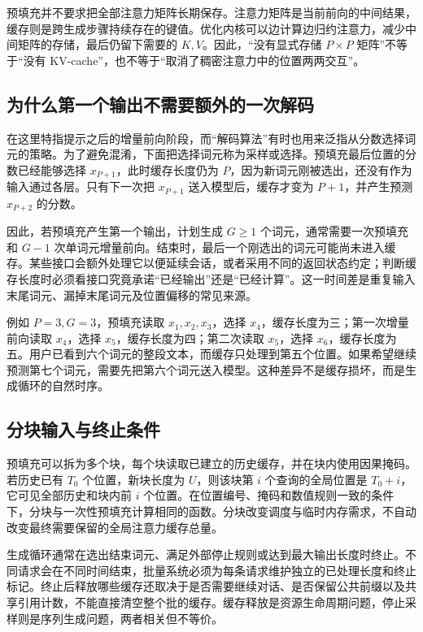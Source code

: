 \documentclass[UTF8,12pt,a4paper,fontset=fandol]{ctexart}
\begin{document}
预填充并不要求把全部注意力矩阵长期保存。注意力矩阵是当前前向的中间结果，缓存则是跨生成步骤持续存在的键值。优化内核可以边计算边归约注意力，减少中间矩阵的存储，最后仍留下需要的 $K,V$。因此，“没有显式存储 $P\times P$ 矩阵”不等于“没有 KV-cache”，也不等于“取消了稠密注意力中的位置两两交互”。

\subsection{为什么第一个输出不需要额外的一次解码}

在这里特指提示之后的增量前向阶段，而“解码算法”有时也用来泛指从分数选择词元的策略。为了避免混淆，下面把选择词元称为采样或选择。预填充最后位置的分数已经能够选择 $x_{P+1}$，此时缓存长度仍为 $P$，因为新词元刚被选出，还没有作为输入通过各层。只有下一次把 $x_{P+1}$ 送入模型后，缓存才变为 $P+1$，并产生预测 $x_{P+2}$ 的分数。

因此，若预填充产生第一个输出，计划生成 $G\geq1$ 个词元，通常需要一次预填充和 $G-1$ 次单词元增量前向。结束时，最后一个刚选出的词元可能尚未进入缓存。某些接口会额外处理它以便延续会话，或者采用不同的返回状态约定；判断缓存长度时必须看接口究竟承诺“已经输出”还是“已经计算”。这一时间差是重复输入末尾词元、漏掉末尾词元及位置偏移的常见来源。

例如 $P=3,G=3$，预填充读取 $x_1,x_2,x_3$，选择 $x_4$，缓存长度为三；第一次增量前向读取 $x_4$，选择 $x_5$，缓存长度为四；第二次读取 $x_5$，选择 $x_6$，缓存长度为五。用户已看到六个词元的整段文本，而缓存只处理到第五个位置。如果希望继续预测第七个词元，需要先把第六个词元送入模型。这种差异不是缓存损坏，而是生成循环的自然时序。

\subsection{分块输入与终止条件}

预填充可以拆为多个块，每个块读取已建立的历史缓存，并在块内使用因果掩码。若历史已有 $T_0$ 个位置，新块长度为 $U$，则该块第 $i$ 个查询的全局位置是 $T_0+i$，它可见全部历史和块内前 $i$ 个位置。在位置编号、掩码和数值规则一致的条件下，分块与一次性预填充计算相同的函数。分块改变调度与临时内存需求，不自动改变最终需要保留的全局注意力缓存总量。

生成循环通常在选出结束词元、满足外部停止规则或达到最大输出长度时终止。不同请求会在不同时间结束，批量系统必须为每条请求维护独立的已处理长度和终止标记。终止后释放哪些缓存还取决于是否需要继续对话、是否保留公共前缀以及共享引用计数，不能直接清空整个批的缓存。缓存释放是资源生命周期问题，停止采样则是序列生成问题，两者相关但不等价。
\end{document}
